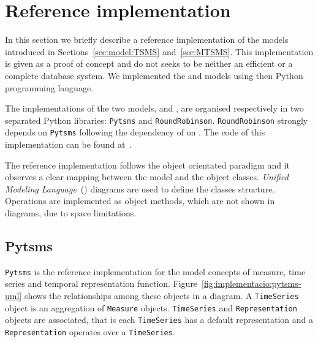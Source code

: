\section{Reference implementation}
\label{sec:implementation}

In this section we briefly describe a reference implementation of the
models introduced in Sections~\ref{sec:model:TSMS}
and~\ref{sec:MTSMS}. This implementation is given as a proof of
concept and do not seeks to be neither an efficient or a complete database
system. We implemented the  and  models using
then Python~\cite{python:doc2} programming language.

The implementations of the two models,  and ,
are organised respectively in two separated Python libraries:
\texttt{Pytsms} and \texttt{RoundRobinson}.  \texttt{RoundRobinson}
strongly depends on \texttt{Pytsms} following the dependency of
 on .  The code of this implementation can be
found at~\cite{llusa:roundrobinson}.

The reference implementation follows the object orientated paradigm
and it observes a clear mapping between the model and the object
classes. \emph{Unified Modeling Language}~() diagrams are used to
define the classes structure.  Operations are implemented as object
methods, which are not shown in  diagrams, due to space
limitations.


\subsection{Pytsms}

\texttt{Pytsms} is the reference implementation for the model concepts
of measure, time series and temporal representation function.
Figure~\ref{fig:implementacio:pytsms-uml} shows the relationships
among these objects in a  diagram. A \texttt{TimeSeries}
object is an aggregation of \texttt{Measure}
objects. \texttt{TimeSeries} and \texttt{Representation} objects are
associated, that is each \texttt{TimeSeries} has a default
representation and a \texttt{Representation} operates over a
\texttt{TimeSeries}.

